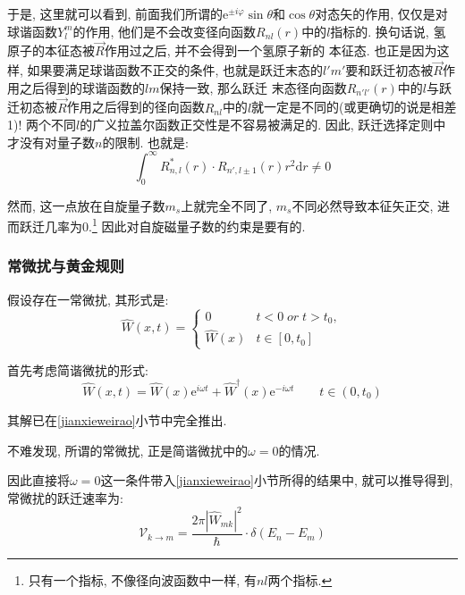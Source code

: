 \documentclass[a4paper, 11pt]{article}
\begin{document}
\begin{spacing}{1.2}
          于是, 这里就可以看到, 前面我们所谓的$\mathrm{e}^{\pm{}i\varphi}\sin{\theta}$和$\cos{\theta}$对态矢的作用, 仅仅是对
          球谐函数$Y_l^m$的作用, 他们是不会改变径向函数$R_{nl}(r)$中的$l$指标的. 换句话说, 氢原子的本征态被$\vec{R}$作用过之后, 并不会得到一个氢原子新的
          本征态. 也正是因为这样, 如果要满足球谐函数不正交的条件, 也就是跃迁末态的$l'm'$要和跃迁初态被$\vec{R}$作用之后得到的球谐函数的$lm$保持一致, 那么跃迁
          末态径向函数$R_{n'l'}(r)$中的$l$与跃迁初态被$\vec{R}$作用之后得到的径向函数$R_{nl}$中的$l$就一定是不同的(或更确切的说是相差1)! 
          两个不同$l$的广义拉盖尔函数正交性是不容易被满足的. 因此, 跃迁选择定则中才没有对量子数$n$的限制. 也就是:  
          \begin{equation} 
            \int_0^{\infty}R_{n,l}^*(r)\cdot{}R_{n',l\pm1}(r)r^2\mathrm{d}r \ne 0
          \end{equation}

          然而, 这一点放在自旋量子数$m_s$上就完全不同了, $m_s$不同必然导致本征矢正交, 进而跃迁几率为$0$.\footnote{只有一个指标, 不像径向波函数中一样, 有$nl$两个指标.}
          因此对自旋磁量子数的约束是要有的.

        \subsubsection{常微扰与黄金规则}
          假设存在一常微扰, 其形式是:
          \begin{equation}
            \hat{W}(x, t) = 
            \begin{cases}
              0 & t<0\;or\;t>t_0,  \\
              \hat{W}(x) &  t \in [0, t_0]
            \end{cases}
          \end{equation}
          
          首先考虑简谐微扰的形式:      
          \begin{equation}
          \hat{W}(x, t) = \hat{W}(x)\mathrm{e}^{i\omega{}t} 
                        + \hat{W}^\dag(x)\mathrm{e}^{-i\omega{}t} \qquad t \in (0, t_0)
          \end{equation}
         
          其解已在\ref{jianxieweirao}小节中完全推出.  

          不难发现, 所谓的常微扰, 正是简谐微扰中的$\omega = 0$的情况.

          因此直接将$\omega = 0$这一条件带入\ref{jianxieweirao}小节所得的结果中, 
          就可以推导得到, 常微扰的跃迁速率为:
          \begin{equation}
            \label{gold_law}
            \mathcal{V}_{k\to{}m} = \frac{2\pi|\hat{W}_{mk}|^2}{\hbar}\cdot\delta(E_n-E_m)
          \end{equation}


\end{spacing}
\end{document}
